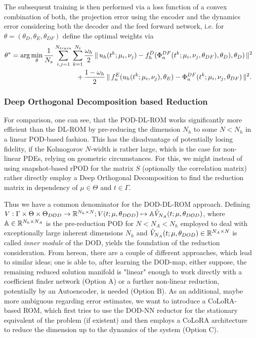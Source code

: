 The subsequent training is then performed via a loss function of a convex combination of both, the projection error using the encoder and the dynamics error considering both the decoder and the feed forward network, i.e. for $\theta = (\theta_D, \theta_E, \theta_{DF})$ define the optimal weights via
\begin{align}
    \theta^* = \operatorname{arg}\min_\theta \frac{1}{N_s} \sum_{i, j = 1}^{N_{train}} \sum_{k = 1}^{N_t} \, &\frac{\omega_h}{2} \, \lVert \, u_h(t^k; \mu_i, \nu_j) - f^D_h(\Phi_n^{DF}(t^k; \mu_i, \nu_j, \theta_{DF}), \theta_D), \theta_{D}) \, \rVert^2 \\
    + \, &\frac{1 - \omega_h}{2} \, \lVert \, f^E_n(u_h(t^k; \mu_i, \nu_j), \theta_E) - \Phi_n^{DF}(t^k; \mu_i, \nu_j, \theta_{DF}) \, \rVert^2.
\end{align}

\subsubsection{Deep Orthogonal Decomposition based Reduction}


For comparison, one can see, that the POD-DL-ROM works significantly more efficient than the DL-ROM by pre-reducing the dimension $N_h$ to some $N < N_h$ in a linear POD-based fashion. This has the disadvantage of potentially losing fidelity, if the Kolmogorov $N$-width is rather large, which is the case for non-linear PDEs, relying on geometric circumstances. For this, we might instead of using snapshot-based rPOD for the matrix $S$ (optionally the correlation matrix) rather directly employ a Deep Orthogonal Decomposition to find the reduction matrix in dependency of $\mu \in \Theta$ and $t \in \Gamma$.

Thus we have a common denominator for the DOD-DL-ROM approach. Defining $V: \Gamma \times \Theta \times \Theta_{DOD} \to \mathbb{R}^{N_h \times N}; V(t; \mu, \theta_{DOD}) \mapsto \mathbb{A} \Tilde{V}_{N_A}(t; \mu, \theta_{DOD})$, where $\mathbb{A} \in \mathbb{R}^{N_h \times N_A}$ is the pre-reduction POD for $N < N_A < N_h$ employed to deal with exceptionally large inherent dimensions $N_h$ and $\Tilde{V}_{N_A}(t; \mu, \theta_{DOD}) \in \mathbb{R}^{N_A \times N}$ is called \emph{inner module} of the DOD, yields the foundation of the reduction consideration. From hereon, there are a couple of different approaches, which lead to similar ideas; one is able to, after learning the DOD-map, either suppose, the remaining reduced solution manifold is "linear" enough to work directly with a coefficient finder network (Option A) or a further non-linear reduction, potentially by an Autoencoder, is needed (Option B). As an additional, maybe more ambiguous regarding error estimates, we want to introduce a CoLoRA-based ROM, which first tries to use the DOD-NN reductor for the stationary equivalent of the problem (if existent) and then employs a CoLoRA architecture to reduce the dimension up to the dynamics of the system (Option C). 

